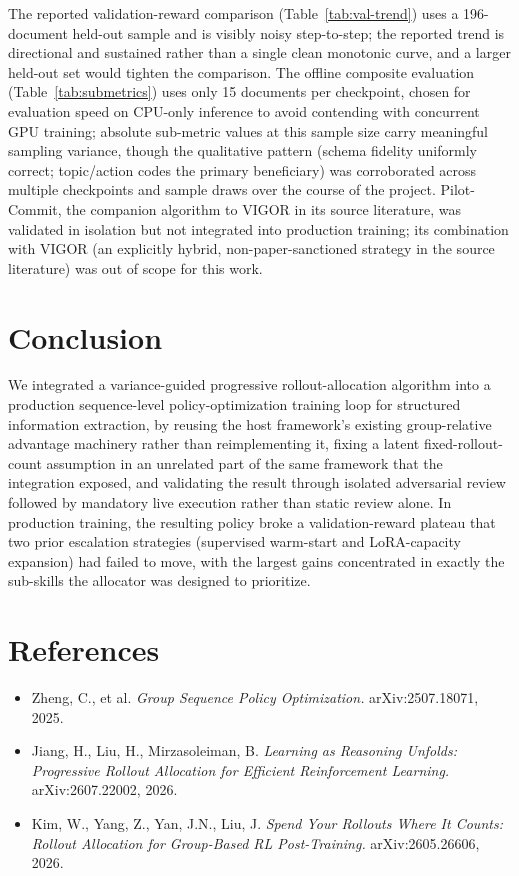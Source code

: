 \documentclass[11pt]{article}
\begin{document}
The reported validation-reward comparison (Table~\ref{tab:val-trend}) uses a
196-document held-out sample and is visibly noisy step-to-step; the reported trend
is directional and sustained rather than a single clean monotonic curve, and a
larger held-out set would tighten the comparison. The offline composite evaluation
(Table~\ref{tab:submetrics}) uses only 15 documents per checkpoint, chosen for
evaluation speed on CPU-only inference to avoid contending with concurrent GPU
training; absolute sub-metric values at this sample size carry meaningful sampling
variance, though the qualitative pattern (schema fidelity uniformly correct;
topic/action codes the primary beneficiary) was corroborated across multiple
checkpoints and sample draws over the course of the project. Pilot-Commit, the
companion algorithm to VIGOR in its source literature, was validated in isolation
but not integrated into production training; its combination with VIGOR (an
explicitly hybrid, non-paper-sanctioned strategy in the source literature) was
out of scope for this work.

\section{Conclusion}

We integrated a variance-guided progressive rollout-allocation algorithm into a
production sequence-level policy-optimization training loop for structured
information extraction, by reusing the host framework's existing group-relative
advantage machinery rather than reimplementing it, fixing a latent
fixed-rollout-count assumption in an unrelated part of the same framework that the
integration exposed, and validating the result through isolated adversarial review
followed by mandatory live execution rather than static review alone. In
production training, the resulting policy broke a validation-reward plateau that
two prior escalation strategies (supervised warm-start and LoRA-capacity expansion)
had failed to move, with the largest gains concentrated in exactly the sub-skills
the allocator was designed to prioritize.

\section*{References}
\begin{itemize}
\item Zheng, C., et al. \emph{Group Sequence Policy Optimization.} arXiv:2507.18071, 2025.
\item Jiang, H., Liu, H., Mirzasoleiman, B. \emph{Learning as Reasoning Unfolds:
  Progressive Rollout Allocation for Efficient Reinforcement Learning.}
  arXiv:2607.22002, 2026.
\item Kim, W., Yang, Z., Yan, J.N., Liu, J. \emph{Spend Your Rollouts Where It
  Counts: Rollout Allocation for Group-Based RL Post-Training.} arXiv:2605.26606, 2026.
\end{itemize}
\end{document}
